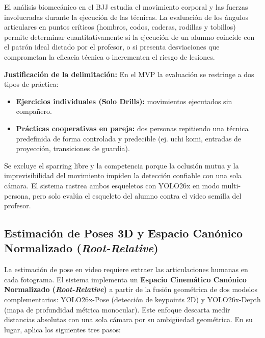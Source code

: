 \documentclass[12pt,letterpaper]{article}
\begin{document}
El análisis biomecánico en el BJJ estudia el movimiento corporal y las fuerzas involucradas durante la ejecución de las técnicas. La evaluación de los ángulos articulares en puntos críticos (hombros, codos, caderas, rodillas y tobillos) permite determinar cuantitativamente si la ejecución de un alumno coincide con el patrón ideal dictado por el profesor, o si presenta desviaciones que comprometan la eficacia técnica o incrementen el riesgo de lesiones.

\textbf{Justificación de la delimitación:} En el MVP la evaluación se restringe a dos tipos de práctica:

\begin{itemize}
    \item \textbf{Ejercicios individuales (Solo Drills):} movimientos ejecutados sin compañero.
    \item \textbf{Prácticas cooperativas en pareja:} dos personas repitiendo una técnica predefinida de forma controlada y predecible (ej. uchi komi, entradas de proyección, transiciones de guardia).
\end{itemize}

Se excluye el sparring libre y la competencia porque la oclusión mutua y la imprevisibilidad del movimiento impiden la detección confiable con una sola cámara. El sistema rastrea ambos esqueletos con YOLO26x en modo multi-persona, pero solo evalúa el esqueleto del alumno contra el video semilla del profesor.

\subsection{Estimación de Poses 3D y Espacio Canónico Normalizado (\textit{Root-Relative})}

La estimación de pose en video requiere extraer las articulaciones humanas en cada fotograma. El sistema implementa un \textbf{Espacio Cinemático Canónico Normalizado (\textit{Root-Relative})} a partir de la fusión geométrica de dos modelos complementarios: YOLO26x-Pose (detección de keypoints 2D) y YOLO26x-Depth (mapa de profundidad métrica monocular). Este enfoque descarta medir distancias absolutas con una sola cámara por su ambigüedad geométrica. En su lugar, aplica los siguientes tres pasos:
\end{document}
